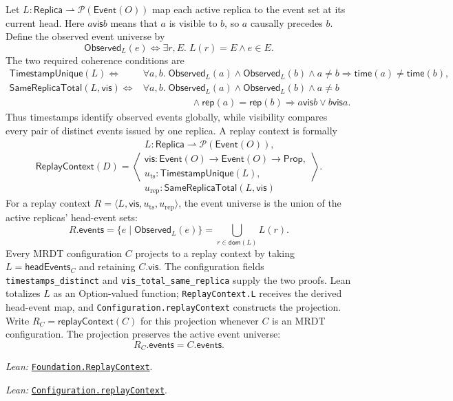\documentclass[11pt]{article}
\theoremstyle{definition}
\newcommand{\Pow}{\mathcal P}
\newcommand{\Event}{\mathsf{Event}}
\newcommand{\Replica}{\mathsf{Replica}}
\newcommand{\vis}{\mathrel{\mathsf{vis}}}
\newcommand{\lean}[1]{\texttt{#1}}
\newcommand{\src}[2]{\href{../../#1}{\texttt{#2}}}
\newcommand{\anchor}[2]{\par\smallskip\noindent\emph{Lean: }\src{#1}{#2}.}
\begin{document}
Let $L:\Replica\rightharpoonup\Pow(\Event(O))$ map each active replica to the
event set at its current head. Here $a\vis b$ means that $a$ is visible to
$b$, so $a$ causally precedes $b$. Define the observed event universe by
\[
 \mathsf{Observed}_L(e)\Longleftrightarrow
 \exists r,E.\;L(r)=E\land e\in E.
\]
The two required coherence conditions are
\[
\begin{aligned}
 \mathsf{TimestampUnique}(L)\Longleftrightarrow{}&
 \forall a,b.\;\mathsf{Observed}_L(a)\land\mathsf{Observed}_L(b)\land a\ne b
 \Rightarrow \mathsf{time}(a)\ne\mathsf{time}(b),\\
 \mathsf{SameReplicaTotal}(L,\vis)\Longleftrightarrow{}&
 \forall a,b.\;\mathsf{Observed}_L(a)\land\mathsf{Observed}_L(b)\land a\ne b\\
 &\hspace{5em}\land\mathsf{rep}(a)=\mathsf{rep}(b)
 \Rightarrow a\vis b\lor b\vis a.
\end{aligned}
\]
Thus timestamps identify observed events globally, while visibility compares
every pair of distinct events issued by one replica. A replay context is
formally
\[
 \mathsf{ReplayContext}(D)=
 \left\langle
 \begin{array}{l}
 L:\Replica\rightharpoonup\Pow(\Event(O)),\\
 \vis:\Event(O)\to\Event(O)\to\mathsf{Prop},\\
 u_{\mathrm{ts}}:\mathsf{TimestampUnique}(L),\\
 u_{\mathrm{rep}}:\mathsf{SameReplicaTotal}(L,\vis)
 \end{array}
 \right\rangle .
\]
For a replay context $R=\langle L,\vis,u_{\mathrm{ts}},u_{\mathrm{rep}}\rangle$,
the event universe is the union of the active replicas' head-event sets:
\[
 R.\mathsf{events}
 =\{e\mid\mathsf{Observed}_L(e)\}
 =\bigcup_{r\in\mathsf{dom}(L)}L(r).
\]
Every MRDT configuration $C$ projects to a replay context by taking
$L=\mathsf{headEvents}_C$ and retaining $C.\vis$. The configuration fields
\lean{timestamps\_distinct} and \lean{vis\_total\_same\_replica} supply the
two proofs. Lean totalizes $L$ as an Option-valued function;
\lean{ReplayContext.L} receives the derived head-event map, and
\lean{Configuration.replayContext} constructs the projection.
Write $R_C=\mathsf{replayContext}(C)$ for this projection whenever $C$ is an
MRDT configuration. The projection preserves the active event universe:
\[
 R_C.\mathsf{events}=C.\mathsf{events}.
\]
\anchor{Sal/MRDTs/Framework/Base/ReplayContext.lean}
  {Foundation.ReplayContext}
\anchor{Sal/MRDTs/Framework/Execution.lean}{Configuration.replayContext}
\end{document}

